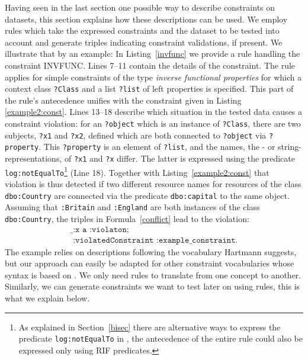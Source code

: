 Having seen in the last section one possible way to describe constraints on \rdf datasets, this section explains how these descriptions can be used. We employ rules
which take the expressed constraints and the \rdf dataset to be tested into account and generate triples indicating constraint validations, if present. 
We illustrate that by an example: In  Listing~\ref{invfunc} we provide a rule handling the constraint INVFUNC. Lines 7--11 contain the details of the constraint. The rule
applies for simple constraints of the type \emph{inverse functional properties} for which a context class \texttt{?Class} and a list \texttt{?list} of left properties 
is specified.
This part of the rule's antecedence unifies with the constraint given in Listing \ref{example2:const}. Lines 13--18 describe which situation in the tested data causes 
a constraint violation: for an \texttt{?object} which is an instance of \texttt{?Class}, there are two subjects, \texttt{?x1} and \texttt{?x2}, defined 
which are both connected 
to \texttt{?object} via \texttt{?property}. This \texttt{?property} is an element of \texttt{?list},
and the names, \ie the \uri- or string-representations, of \texttt{?x1} and \texttt{?x} differ. The latter is expressed using the predicate
\texttt{log:notEqualTo}\footnote{As explained in Section~\ref{bisec} 
there are alternative ways to express the predicate \texttt{log:notEqualTo} in \nthree, the antecedence of the entire rule could also be expressed only using RIF predicates.} 
(Line 18). Together with Listing~\ref{example2:const} that violation is thus detected if two different resource names 
for resources of the class \texttt{dbo:Country} are connected via the predicate \texttt{dbo:capital} to the same object. Assuming that \texttt{:Britain} and \texttt{:England}
are both instances of the class \texttt{dbo:Country}, the triples in Formula~\ref{conflict} lead to the violation:
\begin{multline}
 \texttt{\_:x a :violaton;}\\\texttt{ :violatedConstraint :example\_constraint.}
\end{multline}
The example relies on descriptions following the vocabulary Hartmann suggests, but our approach can easily be adapted for 
other constraint vocabularies whose syntax is based on \rdf. We only need rules to translate from one concept to another. Similarly, we can generate constraints we want to test later on 
using rules, this is what we explain below.

